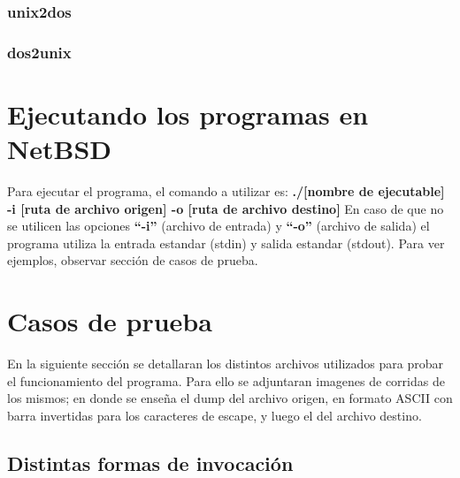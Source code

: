\documentclass[a4paper,10pt]{article}
\begin{document}
    \subsubsection{unix2dos}
      \lstset{numbers=left, frame=single, breaklines=true}
      
    \subsubsection{dos2unix}
      \lstset{numbers=left, frame=single, breaklines=true}
      

\section{Ejecutando los programas en NetBSD}
  Para ejecutar el programa, el comando a utilizar es:
  \newline
  {\bf./[nombre de ejecutable] -i [ruta de archivo origen] -o [ruta de archivo destino]}
  \newline
  En caso de que no se utilicen las opciones {\bf ``-i''} (archivo de entrada) y {\bf ``-o''} (archivo de salida) el 
  programa utiliza la entrada estandar (stdin) y salida estandar (stdout). Para ver ejemplos, observar 
  secci\'on de casos de prueba.


\section{Casos de prueba}
En la siguiente secci\'on se detallaran los distintos archivos utilizados para probar el funcionamiento del
programa. Para ello se adjuntaran imagenes de corridas de los mismos; en donde se ense\~{n}a el dump del 
archivo origen, en formato ASCII con barra invertidas para los caracteres de escape, y luego el del 
archivo destino.

  \subsection{Distintas formas de invocaci\'on}
\end{document}
